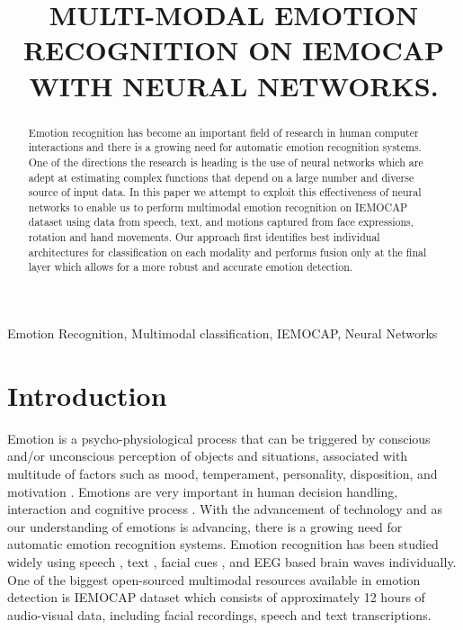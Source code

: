 \documentclass{article}
\title{MULTI-MODAL EMOTION RECOGNITION ON IEMOCAP WITH NEURAL NETWORKS.}
\begin{document}

\address{$^{\ddagger}$ Advanced AI, LG Silicon Valley Lab\\
	Santa Clara, California, USA-94041\\
	{\tt samarthtripathi@gmail.com} \\
	$^{\star}$ Uber Technologies, Bangalore, India\\
	{\tt sarthaktripathi3.gmail.com}\\
	$^{\dagger}$ Recognition Technologies, Inc.\\
	South Salem, New York, USA-10590  \\
	{\tt beigi@recotechnologies.com } \\
	}


\maketitle
\begin{abstract}
Emotion recognition has become an important field of research in human computer interactions and there is a growing need for automatic emotion recognition systems. One of the directions the research is heading is the use of neural networks which are adept at estimating complex functions that depend on a large number and diverse source of input data. In this paper we attempt to exploit this effectiveness of neural networks to enable us to perform multimodal emotion recognition on IEMOCAP dataset using data from speech, text, and motions captured from face expressions, rotation and hand movements. Our approach first identifies best individual architectures for classification on each modality and performs fusion only at the final layer which allows for a more robust and accurate emotion detection.
\end{abstract}
\begin{keywords}
Emotion Recognition, Multimodal classification, IEMOCAP, Neural Networks
\end{keywords}
\section{Introduction}
\label{sec:intro}

Emotion is a psycho-physiological process that can be triggered by conscious and/or unconscious perception of objects and situations, associated with multitude of factors such as mood, temperament, personality, disposition, and motivation \cite{Soleymani}. Emotions are very important in human decision handling, interaction and cognitive process \cite{Sreeshakthy}. With the advancement of technology and as our understanding of emotions is advancing, there is a growing need for automatic emotion recognition systems. Emotion recognition has been studied widely using speech \cite{Lee} \cite{Chernykh} \cite{Neumann}, text \cite{Kim}, facial cues \cite{Bassili}, and EEG based brain waves \cite{Tripathi} individually.  One of the biggest open-sourced multimodal resources available in emotion detection is IEMOCAP dataset \cite{Busso} which consists of approximately 12 hours of audio-visual data, including facial recordings, speech and text transcriptions. 
\end{document}
